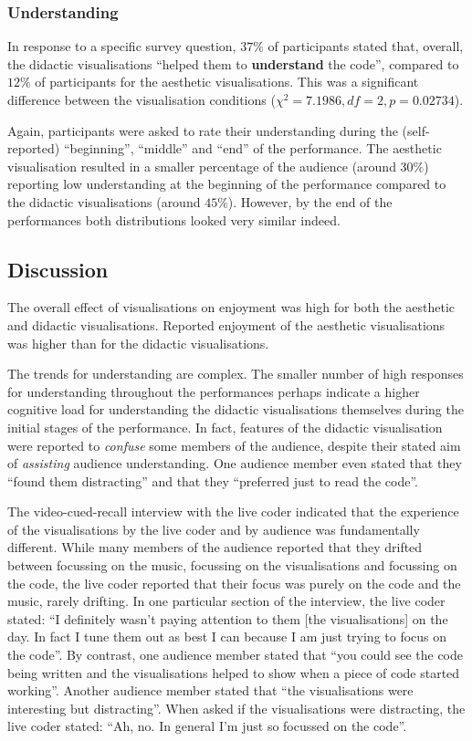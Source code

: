 \documentclass{sig-alternate}
\begin{document}
\subsubsection*{Understanding}

In response to a specific survey question, $37\%$ of participants
stated that, overall, the didactic visualisations ``helped them to
\textbf{understand} the code'', compared to $12\%$ of participants for
the aesthetic visualisations. This was a significant difference
between the visualisation conditions ($\chi^2=7.1986,df=2,p=0.02734$).

Again, participants were asked to rate their understanding during the
(self-reported) ``beginning'', ``middle'' and ``end'' of the
performance. The aesthetic visualisation resulted in a smaller
percentage of the audience (around $30\%$) reporting low understanding
at the beginning of the performance compared to the didactic
visualisations (around $45\%$). However, by the end of the
performances both distributions looked very similar indeed.

\pagebreak

\subsection*{Discussion}

The overall effect of visualisations on enjoyment was high for both
the aesthetic and didactic visualisations. Reported enjoyment of the
aesthetic visualisations was higher than for the didactic
visualisations.

The trends for understanding are complex. The smaller number of high
responses for understanding throughout the performances perhaps
indicate a higher cognitive load for understanding the didactic
visualisations themselves during the initial stages of the
performance. In fact, features of the didactic visualisation were
reported to \emph{confuse} some members of the audience, despite their
stated aim of \emph{assisting} audience understanding. One audience
member even stated that they ``found them distracting'' and that they
``preferred just to read the code''.

The video-cued-recall interview with the live coder indicated that the
experience of the visualisations by the live coder and by audience was
fundamentally different. While many members of the audience reported
that they drifted between focussing on the music, focussing on the
visualisations and focussing on the code, the live coder reported that
their focus was purely on the code and the music, rarely drifting. In
one particular section of the interview, the live coder stated: ``I
definitely wasn't paying attention to them [the visualisations] on the
day. In fact I tune them out as best I can because I am just trying to
focus on the code''. By contrast, one audience member stated that
``you could see the code being written and the visualisations helped
to show when a piece of code started working''. Another audience
member stated that ``the visualisations were interesting but
distracting''. When asked if the visualisations were distracting, the
live coder stated: ``Ah, no. In general I'm just so focussed on the
code''.
\end{document}
